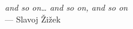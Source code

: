 \thispagestyle{empty}

\vspace*{3cm}

\begin{center}
    \emph{and so on\ldots{} and so on, and so on}\\ \medskip
    --- Slavoj Žižek
\end{center}
